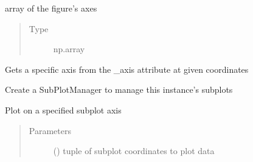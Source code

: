 \documentclass[letterpaper,10pt,english]{sphinxmanual}
\begin{document}
\begin{fulllineitems}
\begin{fulllineitems}
\end{fulllineitems}


\begin{fulllineitems}
\label{\detokenize{dalio.external:dalio.external.image.PySubplotGraph._axes}}
array of the figure’s axes
\begin{quote}\begin{description}
\item[{Type}] \leavevmode
np.array

\end{description}\end{quote}

\end{fulllineitems}


\begin{fulllineitems}
\label{\detokenize{dalio.external:dalio.external.image.PySubplotGraph.get_axis}}
Gets a specific axis from the \_axis attribute at given
coordinates

\end{fulllineitems}


\begin{fulllineitems}
\label{\detokenize{dalio.external:dalio.external.image.PySubplotGraph.make_manager}}
Create a SubPlotManager to manage this instance’s subplots

\end{fulllineitems}


\begin{fulllineitems}
\label{\detokenize{dalio.external:dalio.external.image.PySubplotGraph.plot}}
Plot on a specified subplot axis
\begin{quote}\begin{description}
\item[{Parameters}] \leavevmode
{} () \textendash{} tuple of subplot coordinates to plot data


\end{description}
\end{quote}
\end{fulllineitems}
\end{fulllineitems}
\end{document}
